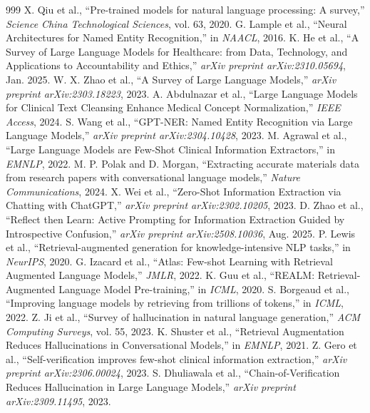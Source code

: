 \documentclass[12pt,oneside]{report}
\begin{document}
\begin{thebibliography}{999}
 X. Qiu et al., ``Pre-trained models for natural language processing: A survey,'' \textit{Science China Technological Sciences}, vol. 63, 2020.
 G. Lample et al., ``Neural Architectures for Named Entity Recognition,'' in \textit{NAACL}, 2016.
 K. He et al., ``A Survey of Large Language Models for Healthcare: from Data, Technology, and Applications to Accountability and Ethics,'' \textit{arXiv preprint arXiv:2310.05694}, Jan. 2025.
 W. X. Zhao et al., ``A Survey of Large Language Models,'' \textit{arXiv preprint arXiv:2303.18223}, 2023.
 A. Abdulnazar et al., ``Large Language Models for Clinical Text Cleansing Enhance Medical Concept Normalization,'' \textit{IEEE Access}, 2024.
 S. Wang et al., ``GPT-NER: Named Entity Recognition via Large Language Models,'' \textit{arXiv preprint arXiv:2304.10428}, 2023.
 M. Agrawal et al., ``Large Language Models are Few-Shot Clinical Information Extractors,'' in \textit{EMNLP}, 2022.
 M. P. Polak and D. Morgan, ``Extracting accurate materials data from research papers with conversational language models,'' \textit{Nature Communications}, 2024.
 X. Wei et al., ``Zero-Shot Information Extraction via Chatting with ChatGPT,'' \textit{arXiv preprint arXiv:2302.10205}, 2023.
 D. Zhao et al., ``Reflect then Learn: Active Prompting for Information Extraction Guided by Introspective Confusion,'' \textit{arXiv preprint arXiv:2508.10036}, Aug. 2025.
 P. Lewis et al., ``Retrieval-augmented generation for knowledge-intensive NLP tasks,'' in \textit{NeurIPS}, 2020.
 G. Izacard et al., ``Atlas: Few-shot Learning with Retrieval Augmented Language Models,'' \textit{JMLR}, 2022.
 K. Guu et al., ``REALM: Retrieval-Augmented Language Model Pre-training,'' in \textit{ICML}, 2020.
 S. Borgeaud et al., ``Improving language models by retrieving from trillions of tokens,'' in \textit{ICML}, 2022.
 Z. Ji et al., ``Survey of hallucination in natural language generation,'' \textit{ACM Computing Surveys}, vol. 55, 2023.
 K. Shuster et al., ``Retrieval Augmentation Reduces Hallucinations in Conversational Models,'' in \textit{EMNLP}, 2021.
 Z. Gero et al., ``Self-verification improves few-shot clinical information extraction,'' \textit{arXiv preprint arXiv:2306.00024}, 2023.
 S. Dhuliawala et al., ``Chain-of-Verification Reduces Hallucination in Large Language Models,'' \textit{arXiv preprint arXiv:2309.11495}, 2023.


\end{thebibliography}
\end{document}
